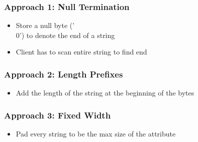 \documentclass[11pt]{article}
\begin{document}
        \subsubsection*{Approach 1: Null Termination}
        \begin{itemize}
            \item Store a null byte ('\\0') to denote the end of a string
            \item Client has to scan entire string to find end
        \end{itemize}

        \subsubsection*{Approach 2: Length Prefixes}
        \begin{itemize}
            \item Add the length of the string at the beginning of the bytes
        \end{itemize}

        \subsubsection*{Approach 3: Fixed Width}
        \begin{itemize}
            \item Pad every string to be the max size of the attribute
        \end{itemize}
\end{document}
